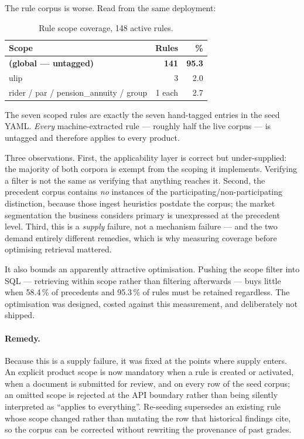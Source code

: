 \documentclass[10pt]{article}
\begin{document}
The rule corpus is worse. Read from the same deployment:

\begin{table}[htbp]
\centering
\caption{Rule scope coverage, 148 active rules.}
\begin{tabular}{@{}lr r@{}}
\toprule
\textbf{Scope} & \textbf{Rules} & \textbf{\%} \\
\midrule
\textbf{(global --- untagged)} & \textbf{141} & \textbf{95.3} \\
ulip & 3 & 2.0 \\
rider / par / pension\_annuity / group & 1 each & 2.7 \\
\bottomrule
\end{tabular}
\end{table}

The seven scoped rules are exactly the seven hand-tagged entries in the seed
YAML. \emph{Every} machine-extracted rule --- roughly half the live corpus ---
is untagged and therefore applies to every product.

Three observations. First, the applicability layer is correct but
under-supplied: the majority of both corpora is exempt from the scoping it
implements. Verifying a filter is not the same as verifying that anything
reaches it. Second, the precedent corpus contains \emph{no} instances of the
participating/non-participating distinction, because those ingest heuristics
postdate the corpus; the market segmentation the business considers primary is
unexpressed at the precedent level. Third, this is a \emph{supply} failure, not
a mechanism failure --- and the two demand entirely different remedies, which
is why measuring coverage before optimising retrieval mattered.

It also bounds an apparently attractive optimisation. Pushing the scope filter
into SQL --- retrieving within scope rather than filtering afterwards --- buys
little when 58.4\,\% of precedents and 95.3\,\% of rules must be retained
regardless. The optimisation was designed, costed against this measurement, and
deliberately not shipped.

\paragraph{Remedy.} Because this is a supply failure, it was fixed at the points
where supply enters. An explicit product scope is now mandatory when a rule is
created or activated, when a document is submitted for review, and on every row
of the seed corpus; an omitted scope is rejected at the API boundary rather than
being silently interpreted as ``applies to everything''. Re-seeding supersedes
an existing rule whose scope changed rather than mutating the row that
historical findings cite, so the corpus can be corrected without rewriting the
provenance of past grades.
\end{document}

